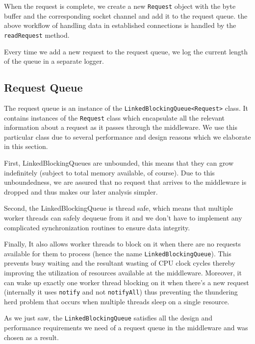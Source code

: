 \documentclass[11pt,a4paper]{article}
\begin{document}
When the request is complete, we create a new \texttt{Request} object with the byte buffer and the corresponding socket channel and add it to the request queue. the above workflow of handling data in established connections is handled by the \texttt{readRequest} method.


Every time we add a new request to the request queue, we log the current length of the queue in a separate logger.

\subsection{Request Queue}
	The request queue is an instance of the \texttt{LinkedBlockingQueue<Request>} class. It contains instances of the \texttt{Request} class which encapsulate all the relevant information about a request as it passes through the middleware. We use this particular class due to several performance and design reasons which we elaborate in this section.


First, LinkedBlockingQueues are unbounded, this means that they can grow indefinitely (subject to total memory available, of course). Due to this unboundedness, we are assured that no request that arrives to the middleware is dropped and thus makes our later analysis simpler. 


Second, the LinkedBlockingQueue is thread safe, which means that multiple worker threads can safely dequeue from it and we don’t have to implement any complicated synchronization routines to ensure data integrity. 


Finally, It also allows worker threads to block on it when there are no requests available for them to process (hence the name \texttt{LinkedBlockingQueue}). This prevents busy waiting and the resultant wasting of CPU clock cycles thereby improving the utilization of resources available at the middleware. Moreover, it can wake up exactly one worker thread blocking on it when there’s a new request (internally it uses \texttt{notify} and not \texttt{notifyAll}) thus preventing the thundering herd problem that occurs when multiple threads sleep on a single resource.


As we just saw, the \texttt{LinkedBlockingQueue} satisfies all the design and performance requirements we need of a request queue in the middleware and was chosen as a result.
\end{document}
